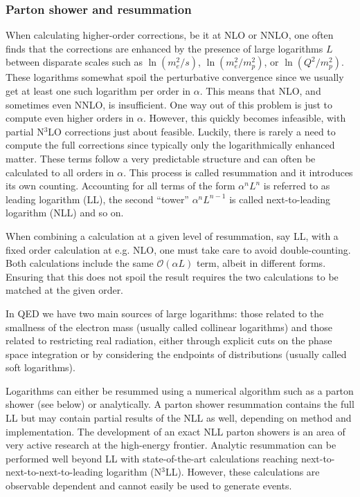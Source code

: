 \subsubsection{Parton shower and resummation}
\label{sec:mc:resum}

When calculating higher-order corrections, be it at NLO or NNLO, one often finds that the corrections are enhanced by the presence of large logarithms $L$ between disparate scales such as $\ln(m_e^2/s)$, $\ln(m_e^2/m_p^2)$, or $\ln(Q^2/m_p^2)$.
These logarithms somewhat spoil the perturbative convergence since we usually get at least one such logarithm per order in $\alpha$.
This means that NLO, and sometimes even NNLO, is insufficient.
One way out of this problem is just to compute even higher orders in $\alpha$.
However, this quickly becomes infeasible, with partial N$^3$LO corrections just about feasible.
Luckily, there is rarely a need to compute the full corrections since typically only the logarithmically enhanced matter.
These terms follow a very predictable structure and can often be calculated to all orders in $\alpha$.
This process is called resummation and it introduces its own counting.
Accounting for all terms of the form $\alpha^n L^n$ is referred to as leading logarithm (LL), the second ``tower'' $\alpha^n L^{n-1}$ is called next-to-leading logarithm (NLL) and so on.

When combining a calculation at a given level of resummation, say LL, with a fixed order calculation at e.g. NLO, one must take care to avoid double-counting.
Both calculations include the same $\mathcal{O}(\alpha L)$ term, albeit in different forms.
Ensuring that this does not spoil the result requires the two calculations to be matched at the given order.

In QED we have two main sources of large logarithms: those related to the smallness of the electron mass (usually called collinear logarithms) and those related to restricting real radiation, either through explicit cuts on the phase space integration or by considering the endpoints of distributions (usually called soft logarithms).

Logarithms can either be resummed using a numerical algorithm such as a parton shower (see below) or analytically.
A parton shower resummation contains the full LL but may contain partial results of the NLL as well, depending on method and implementation.
The development of an exact NLL parton showers is an area of very active research at the high-energy frontier.
Analytic resummation can be performed well beyond LL with state-of-the-art calculations reaching next-to-next-to-next-to-leading logarithm (N$^3$LL).
However, these calculations are observable dependent and cannot easily be used to generate events.

